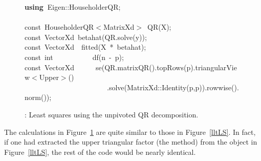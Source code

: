 \documentclass[shortnames,article,nojss]{jss}
\newcommand{\hlstd}[1]{\textcolor[rgb]{0,0,0}{#1}}
\newcommand{\hlopt}[1]{\textcolor[rgb]{0,0,0}{#1}}
\newcommand{\hlkwa}[1]{\textcolor[rgb]{0.61,0.13,0.93}{\bf{#1}}}
\newcommand{\hlkwb}[1]{\textcolor[rgb]{0.13,0.54,0.13}{#1}}
\newcommand{\hlkwd}[1]{\textcolor[rgb]{0,0,0}{#1}}
\begin{document}
\begin{figure}[htb]
    \noindent
    \ttfamily
    \hlstd{}\hlkwa{using\ }\hlstd{Eigen}\hlopt{::}\hlstd{HouseholderQR}\hlopt{;}\hspace*{\fill}\\
    \hlstd{}\hspace*{\fill}\\
    \hlkwb{const\ }\hlstd{HouseholderQR}\hlopt{$<$}\hlstd{MatrixXd}\hlopt{$>$\ }\hlstd{}\hlkwd{QR}\hlstd{}\hlopt{(}\hlstd{X}\hlopt{);}\hspace*{\fill}\\
    \hlstd{}\hlkwb{const\ }\hlstd{VectorXd\ }\hlkwd{betahat}\hlstd{}\hlopt{(}\hlstd{QR}\hlopt{.}\hlstd{}\hlkwd{solve}\hlstd{}\hlopt{(}\hlstd{y}\hlopt{));}\hspace*{\fill}\\
    \hlstd{}\hlkwb{const\ }\hlstd{VectorXd}\hlstd{\ \ }\hlstd{}\hlkwd{fitted}\hlstd{}\hlopt{(}\hlstd{X\ }\hlopt{{*}\ }\hlstd{betahat}\hlopt{);}\hspace*{\fill}\\
    \hlstd{}\hlkwb{const\ int}\hlstd{\ \ \ \ \ \ \ \ \ \ \ }\hlkwb{}\hlstd{}\hlkwd{df}\hlstd{}\hlopt{(}\hlstd{n\ }\hlopt{{-}\ }\hlstd{p}\hlopt{);}\hspace*{\fill}\\
    \hlstd{}\hlkwb{const\ }\hlstd{VectorXd}\hlstd{\ \ \ \ \ \ }\hlstd{}\hlkwd{se}\hlstd{}\hlopt{(}\hlstd{QR}\hlopt{.}\hlstd{}\hlkwd{matrixQR}\hlstd{}\hlopt{().}\hlstd{}\hlkwd{topRows}\hlstd{}\hlopt{(}\hlstd{p}\hlopt{).}\hlstd{triangularView}\hlopt{$<$}\hlstd{Upper}\hlopt{$>$()}\hspace*{\fill}\\
    \hlstd{}\hlstd{\ \ \ \ \ \ \ \ \ \ \ \ \ \ \ \ \ \ \ \ \ \ \ }\hlstd{}\hlopt{.}\hlstd{}\hlkwd{solve}\hlstd{}\hlopt{(}\hlstd{MatrixXd}\hlopt{::}\hlstd{}\hlkwd{Identity}\hlstd{}\hlopt{(}\hlstd{p}\hlopt{,}\hlstd{p}\hlopt{)).}\hlstd{}\hlkwd{rowwise}\hlstd{}\hlopt{().}\hlstd{}\hlkwd{norm}\hlstd{}\hlopt{());}\hlstd{}\hspace*{\fill}\\
    \mbox{}
    \normalfont
    \normalsize
    \caption{: Least squares using the unpivoted QR decomposition.}
    \label{QRLS}
\end{figure}
The calculations in Figure~\ref{QRLS} are quite similar to those in
Figure~\ref{lltLS}.  In fact, if one had extracted the upper
triangular factor (the  method) from the 
object in Figure~\ref{lltLS}, the rest of the code would be nearly
identical.
\end{document}
